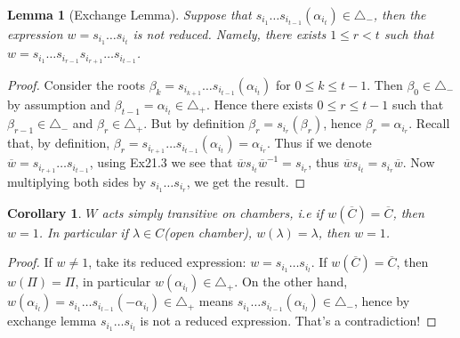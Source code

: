 \documentclass[10pt,twoside]{article}
\newtheorem{corollary}[theorem]{Corollary}
\newtheorem{lemma}[theorem]{Lemma}
\theoremstyle{definition}
\theoremstyle{remark}
\begin{document}
\begin{lemma} [Exchange Lemma]
 Suppose that $s_{i_{1}}\ldots
s_{i_{t-1}}(\alpha_{i_{t}})\in \triangle_{-}$, then the expression
$w=s_{i_{1}}\ldots s_{i_{t}}$ is not reduced. Namely, there exists
$1\leq r<t$ such that $w=s_{i_{1}}\ldots
s_{i_{r-1}}s_{i_{r+1}}\ldots s_{i_{t-1}}$.

\end{lemma}

\begin{proof}
Consider the roots $\beta_{k}=s_{i_{k+1}}\ldots
s_{i_{t-1}}(\alpha_{i_{t}})$ for $0\leq k\leq t-1$. Then
$\beta_{0}\in\triangle_{-}$ by assumption and
$\beta_{t-1}=\alpha_{i_{t}}\in\triangle_{+}$. Hence there exists
$0\leq r\leq t-1$ such that $\beta_{r-1}\in\triangle_{-}$ and
$\beta_{r}\in\triangle_{+}$. But by definition
$\beta_{r}=s_{i_{r}}(\beta_{r})$, hence
$\beta_{r}=\alpha_{i_{r}}$. Recall that, by definition,
$\beta_{r}=s_{i_{r+1}}\ldots
s_{i_{t-1}}(\alpha_{i_{t}})=\alpha_{i_{r}}$. Thus if we denote
$\overline{w}=s_{i_{r+1}}\ldots s_{i_{t-1}}$, using Ex21.3 we see
that $\overline{w}s_{i_{t}}\overline{w}^{-1}=s_{i_{r}}$, thus
$\overline{w}s_{i_{t}}=s_{i_{r}}\overline{w}$. Now multiplying both
sides by $s_{i_{1}}\ldots s_{i_{r}}$, we get the result.
\end{proof}

\begin{corollary}
 $W$ acts simply transitive on chambers, i.e if
$w(\overline{C})=\overline{C}$, then $w=1$. In particular if
$\lambda\in C$(open chamber), $w(\lambda)=\lambda$, then
$w=1$.
\end{corollary}

\begin{proof}
 If $w\neq1$, take its reduced expression:
$w=s_{i_{1}}\ldots s_{i_{l}}$. If $w(\overline{C})=\overline{C}$,
then $w(\Pi)=\Pi$, in particular $w(\alpha_{i_{l}})\in
\triangle_{+}$. On the other hand,
$w(\alpha_{i_{l}})=s_{i_{1}}\ldots s_{i_{l-1}}(-\alpha_{i_{l}})\in
\triangle_{+}$ means $s_{i_{1}}\ldots
s_{i_{l-1}}(\alpha_{i_{l}})\in \triangle_{-}$, hence by exchange
lemma $s_{i_{1}}\ldots s_{i_{l}}$ is not a reduced expression.
That's a contradiction!
\end{proof}
\end{document}

